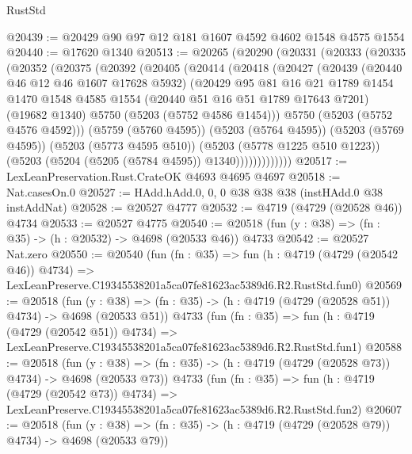 \begin{lexlean}{RustStd}
\begin{coremodule}
@20439 := @20429 @90 @97 @12 @181 @1607 @4592 @4602 @1548 @4575 @1554
@20440 := @17620 @1340
@20513 := @20265
    (@20290
      (@20331
        (@20333
          (@20335
            (@20352
              (@20375
                (@20392
                  (@20405
                    (@20414
                      (@20418
                        (@20427
                          (@20439
                            (@20440 @46 @12 @46 @1607 @17628 @5932)
                            (@20429
                              @95
                              @81
                              @16
                              @21
                              @1789
                              @1454
                              @1470
                              @1548
                              @4585
                              @1554
                              (@20440 @51 @16 @51 @1789 @17643 @7201)
                              (@19682 @1340)
                              @5750
                              (@5203 (@5752 @4586 @1454)))
                            @5750
                            (@5203 (@5752 @4576 @4592)))
                          (@5759 (@5760 @4595))
                          (@5203 (@5764 @4595))
                          (@5203 (@5769 @4595))
                          (@5203 (@5773 @4595 @510))
                          (@5203 (@5778 @1225 @510 @1223))
                          (@5203 (@5204 (@5205 (@5784 @4595)) @1340)))))))))))))
@20517 := LexLeanPreservation.Rust.CrateOK @4693 @4695 @4697
@20518 := Nat.casesOn.{0}
@20527 := HAdd.hAdd.{0, 0, 0} @38 @38 @38 (instHAdd.{0} @38 instAddNat)
@20528 := @20527 @4777
@20532 := @4719 (@4729 (@20528 @46)) @4734
@20533 := @20527 @4775
@20540 := @20518 (fun (y : @38) => (fn : @35) -> (h : @20532) -> @4698 (@20533 @46)) @4733
@20542 := @20527 Nat.zero
@20550 := @20540
    (fun (fn : @35) =>
    fun (h : @4719 (@4729 (@20542 @46)) @4734) =>
    LexLeanPreserve.C19345538201a5ca07fe81623ac5389d6.R2.RustStd.fun0)
@20569 := @20518
    (fun (y : @38) => (fn : @35) -> (h : @4719 (@4729 (@20528 @51)) @4734) -> @4698 (@20533 @51))
    @4733
    (fun (fn : @35) =>
    fun (h : @4719 (@4729 (@20542 @51)) @4734) =>
    LexLeanPreserve.C19345538201a5ca07fe81623ac5389d6.R2.RustStd.fun1)
@20588 := @20518
    (fun (y : @38) => (fn : @35) -> (h : @4719 (@4729 (@20528 @73)) @4734) -> @4698 (@20533 @73))
    @4733
    (fun (fn : @35) =>
    fun (h : @4719 (@4729 (@20542 @73)) @4734) =>
    LexLeanPreserve.C19345538201a5ca07fe81623ac5389d6.R2.RustStd.fun2)
@20607 := @20518
    (fun (y : @38) => (fn : @35) -> (h : @4719 (@4729 (@20528 @79)) @4734) -> @4698 (@20533 @79))

\end{coremodule}
\end{lexlean}

